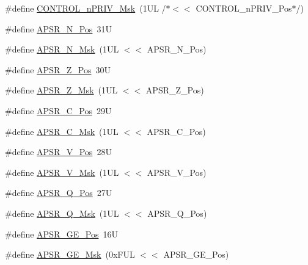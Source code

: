 \begin{DoxyCompactItemize}
\item 
\#define \mbox{\hyperlink{group___c_m_s_i_s___c_o_r_e_gaef3b20d77acb213338f89ce5e7bc36b0}{C\+O\+N\+T\+R\+O\+L\+\_\+n\+P\+R\+I\+V\+\_\+\+Msk}}~(1\+U\+L /$\ast$$<$$<$ C\+O\+N\+T\+R\+O\+L\+\_\+n\+P\+R\+I\+V\+\_\+\+Pos$\ast$/)
\item 
\#define \mbox{\hyperlink{group___c_m_s_i_s___c_o_r_e_gac469528d210043c7bd3f12f0e6824766}{A\+P\+S\+R\+\_\+\+N\+\_\+\+Pos}}~31U
\item 
\#define \mbox{\hyperlink{group___c_m_s_i_s___c_o_r_e_gadbc2cf55a026f661b53fadfcf822cef1}{A\+P\+S\+R\+\_\+\+N\+\_\+\+Msk}}~(1\+U\+L $<$$<$ A\+P\+S\+R\+\_\+\+N\+\_\+\+Pos)
\item 
\#define \mbox{\hyperlink{group___c_m_s_i_s___c_o_r_e_ga3661286d108b1aca308d7445685eae3a}{A\+P\+S\+R\+\_\+\+Z\+\_\+\+Pos}}~30U
\item 
\#define \mbox{\hyperlink{group___c_m_s_i_s___c_o_r_e_ga1deb4d1aa72bb83d1f79329406f15711}{A\+P\+S\+R\+\_\+\+Z\+\_\+\+Msk}}~(1\+U\+L $<$$<$ A\+P\+S\+R\+\_\+\+Z\+\_\+\+Pos)
\item 
\#define \mbox{\hyperlink{group___c_m_s_i_s___c_o_r_e_ga6cf72aa6f09a168f9e5beda1a4a887b9}{A\+P\+S\+R\+\_\+\+C\+\_\+\+Pos}}~29U
\item 
\#define \mbox{\hyperlink{group___c_m_s_i_s___c_o_r_e_ga6d47803fbad455bc10bd1ce59f2f335d}{A\+P\+S\+R\+\_\+\+C\+\_\+\+Msk}}~(1\+U\+L $<$$<$ A\+P\+S\+R\+\_\+\+C\+\_\+\+Pos)
\item 
\#define \mbox{\hyperlink{group___c_m_s_i_s___c_o_r_e_gac62830f67679ccd11658c4172c3e6ea7}{A\+P\+S\+R\+\_\+\+V\+\_\+\+Pos}}~28U
\item 
\#define \mbox{\hyperlink{group___c_m_s_i_s___c_o_r_e_ga33305d6701356bff6890b315fe8b5489}{A\+P\+S\+R\+\_\+\+V\+\_\+\+Msk}}~(1\+U\+L $<$$<$ A\+P\+S\+R\+\_\+\+V\+\_\+\+Pos)
\item 
\#define \mbox{\hyperlink{group___c_m_s_i_s___c_o_r_e_ga298749e176f12827328bb7b92a6b2411}{A\+P\+S\+R\+\_\+\+Q\+\_\+\+Pos}}~27U
\item 
\#define \mbox{\hyperlink{group___c_m_s_i_s___c_o_r_e_ga90ffd4ec4149c2f5dd7747c1533fb002}{A\+P\+S\+R\+\_\+\+Q\+\_\+\+Msk}}~(1\+U\+L $<$$<$ A\+P\+S\+R\+\_\+\+Q\+\_\+\+Pos)
\item 
\#define \mbox{\hyperlink{group___c_m_s_i_s___c_o_r_e_ga722cb42b5c75af3e8909fac6fd40dfdc}{A\+P\+S\+R\+\_\+\+G\+E\+\_\+\+Pos}}~16U
\item 
\#define \mbox{\hyperlink{group___c_m_s_i_s___c_o_r_e_ga8a3ecbc0ea2029462b0f4ce50e227db1}{A\+P\+S\+R\+\_\+\+G\+E\+\_\+\+Msk}}~(0x\+F\+U\+L $<$$<$ A\+P\+S\+R\+\_\+\+G\+E\+\_\+\+Pos)

\end{DoxyCompactItemize}
